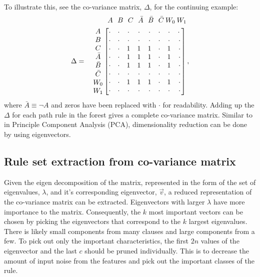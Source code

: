 \documentclass[11pt]{article}
\begin{document}
To illustrate this, see the co-variance matrix, $\Delta$, for the continuing example:
\begin{align*}
&\;\:A\:\:\:B\:\:\:C\:\:\:\bar{A}\:\:\:\bar{B}\:\:\:\bar{C}\:W_0\:W_1\\
\Delta = \quad \mqty{A\\B\\C\\\bar{A}\\\bar{B}\\\bar{C}\\W_0\\W_1}\, &\mqty[\cdot&\cdot&\cdot&\cdot&\cdot&\cdot&\cdot&\cdot\:\\\cdot&\cdot&\cdot&\cdot&\cdot&\cdot&\cdot&\cdot\\\cdot&\cdot&1&1&1&\cdot&1&\cdot\\\cdot&\cdot&1&1&1&\cdot&1&\cdot\\\cdot&\cdot&1&1&1&\cdot&1&\cdot\\\cdot&\cdot&\cdot&\cdot&\cdot&\cdot&\cdot&\cdot\\\cdot&\cdot&1&1&1&\cdot&1&\cdot\\\cdot&\cdot&\cdot&\cdot&\cdot&\cdot&\cdot&\cdot] \, ,
\end{align*}
where $\bar{A} \equiv \neg A$ and zeros have been replaced with $\cdot$ for readability. Adding up the $\Delta$ for each path rule in the forest gives a complete co-variance matrix. Similar to in Principle Component Analysis (PCA), dimensionality reduction can be done by using eigenvectors.

\subsection{Rule set extraction from co-variance matrix}
Given the eigen decomposition of the matrix, represented in the form of the set of eigenvalues, $\lambda$, and it's corresponding eigenvector, $\vec{v}$, a reduced representation of the co-variance matrix can be extracted. Eigenvectors with larger $\lambda$ have more importance to the matrix. Consequently, the $k$ most important vectors can be chosen by picking the eigenvectors that correspond to the $k$ largest eigenvalues. There is likely small components from many clauses and large components from a few. To pick out only the important characteristics, the first $2n$ values of the eigenvector and the last $c$ should be pruned individually. This is to decrease the amount of input noise from the features and pick out the important classes of the rule. 
\end{document}
